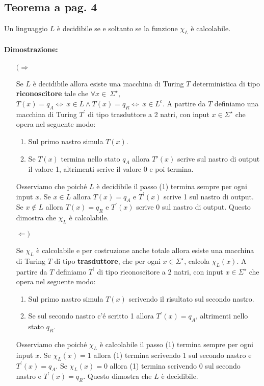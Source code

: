 \subsection{Teorema a pag. 4}
Un linguaggio $L$ è decidibile se e soltanto se la funzione $\chi_{L}$ è calcolabile.

\paragraph*{Dimostrazione:}
\begin{itemize}
    \item[$(\Rightarrow$]{
        Se $L$ è decidibile allora esiste una macchina di Turing $T$ deterministica di tipo \textbf{riconoscitore} tale che $\forall x\in\ \Sigma^{\star}$, $T(x) = q_{A} \Leftrightarrow\ x\in L \land T(x) = q_{R} \Leftrightarrow\ x\in L^{c}$.
        A partire da $T$ definiamo una macchina di Turing $T^{'}$ di tipo trasduttore a 2 natri, con input $x\in\Sigma^{\star}$ che opera nel seguente modo:
        \begin{enumerate}
            \item Sul primo nastro simula $T(x)$.
            \item Se $T(x)$ termina nello stato $q_{A}$ allora $T{'}(x)$ scrive sul nastro di output il valore 1, altrimenti scrive il valore 0 e poi termina.
        \end{enumerate}
        Osserviamo che poiché $L$ è decidibile il passo (1) termina sempre per ogni input $x$. Se $x\in L$ allora $T(x) = q_{A}$ e $T^{'}(x)$ scrive 1 sul nastro di output.
        Se $x\notin L$ allora $T(x) = q_{R}$ e $T^{'}(x)$ scrive 0 sul nastro di output. Questo dimostra che $\chi_{L}$ è calcolabile.
    }
    \item[$\Leftarrow)$]{
        Se $\chi_{L}$ è calcolabile e per costruzione anche totale allora esiste una macchina di Turing $T$ di tipo \textbf{trasduttore}, che per ogni $x\in \Sigma^{\star}$, calcola $\chi_{L}(x)$.
        A partire da $T$ definiamo $T^{'}$ di tipo riconoscitore a 2 natri, con input $x\in\Sigma^{\star}$ che opera nel seguente modo:
        \begin{enumerate}
            \item Sul primo nastro simula $T(x)$ scrivendo il risultato sul secondo nastro.
            \item Se sul secondo nastro c'é scritto 1 allora $T^{'}(x) = q_{A}$, altrimenti nello stato $q_{R}$.
        \end{enumerate}
        Osserviamo che poiché $\chi_{L}$ è calcolabile il passo (1) termina sempre per ogni input $x$. Se $\chi_{L}(x) = 1$ allora (1) termina scrivendo 1 sul secondo nastro e $T^{'}(x) = q_{A}$.
        Se $\chi_{L}(x) = 0$ allora (1) termina scrivendo 0 sul secondo nastro e $T^{'}(x) = q_{R}$. Questo dimostra che $L$ è decidibile.
    }
\end{itemize}

